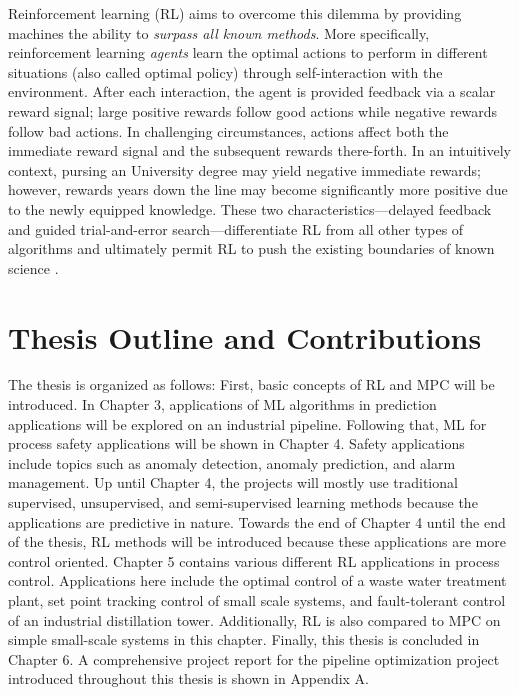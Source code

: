 Reinforcement learning (RL) aims to overcome this dilemma by providing machines the ability to \textit{surpass all known methods}.  More specifically, reinforcement learning \textit{agents} learn the optimal actions to perform in different situations (also called optimal policy) through self-interaction with the environment.  After each interaction, the agent is provided feedback via a scalar reward signal; large positive rewards follow good actions while negative rewards follow bad actions.  In challenging circumstances, actions affect both the immediate reward signal and the subsequent rewards there-forth. In an intuitively context, pursing an University degree may yield negative immediate rewards; however, rewards years down the line may become significantly more positive due to the newly equipped knowledge.  These two characteristics---delayed feedback and guided trial-and-error search---differentiate RL from all other types of algorithms and ultimately permit RL to push the existing boundaries of known science \cite{sutton}.

\section{Thesis Outline and Contributions}
The thesis is organized as follows: First, basic concepts of RL and MPC will be introduced.  In Chapter 3, applications of ML algorithms in prediction applications will be explored on an industrial pipeline.  Following that, ML for process safety applications will be shown in Chapter 4. Safety applications include topics such as anomaly detection, anomaly prediction, and alarm management. Up until Chapter 4, the projects will mostly use traditional supervised, unsupervised, and semi-supervised learning methods because the applications are predictive in nature.  Towards the end of Chapter 4 until the end of the thesis, RL methods will be introduced because these applications are more control oriented. Chapter 5 contains various different RL applications in process control. Applications here include the optimal control of a waste water treatment plant, set point tracking control of small scale systems, and fault-tolerant control of an industrial distillation tower. Additionally, RL is also compared to MPC on simple small-scale systems in this chapter. Finally, this thesis is concluded in Chapter 6.  A comprehensive project report for the pipeline optimization project introduced throughout this thesis is shown in Appendix A.

